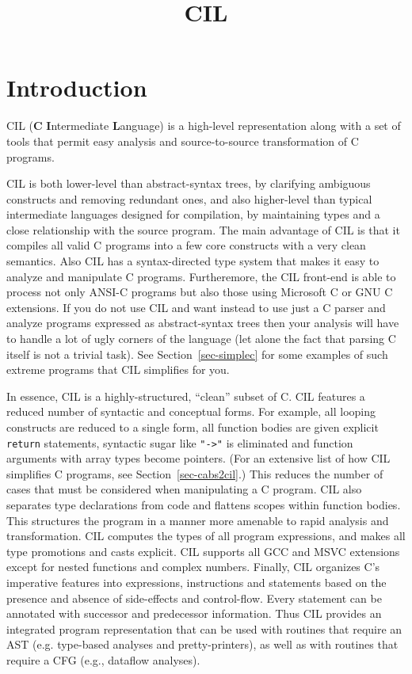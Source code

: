 \documentclass{article}
\title{CIL}
\def\secref#1{Section~\ref{sec-#1}}
\begin{document}
\maketitle

\section{Introduction}

 CIL ({\bf C} {\bf I}ntermediate {\bf L}anguage) is a high-level representation
along with a set of tools that permit easy analysis and source-to-source
transformation of C programs.

 CIL is both lower-level than abstract-syntax trees, by clarifying ambiguous
constructs and removing redundant ones, and also higher-level than typical
intermediate languages designed for compilation, by maintaining types and a
close relationship with the source program. The main advantage of CIL is that
it compiles all valid C programs into a few core constructs with a very clean
semantics. Also CIL has a syntax-directed type system that makes it easy to
analyze and manipulate C programs. Furtheremore, the CIL front-end is able to
process not only ANSI-C programs but also those using Microsoft C or GNU C
extensions. If you do not use CIL and want instead to use just a C parser and
analyze programs expressed as abstract-syntax trees then your analysis will
have to handle a lot of ugly corners of the language (let alone the fact that
parsing C itself is not a trivial task). See \secref{simplec} for some
examples of such extreme programs that CIL simplifies for you.

 In essence, CIL is a highly-structured, ``clean'' subset of C. CIL features a
reduced number of syntactic and conceptual forms. For example, all looping
constructs are reduced to a single form, all function bodies are given
explicit {\tt return} statements, syntactic sugar like {\tt "->"} is
eliminated and function arguments with array types become pointers. (For an
extensive list of how CIL simplifies C programs, see \secref{cabs2cil}.)
This reduces the number of cases that must be considered when manipulating a C
program. CIL also separates type declarations from code and flattens scopes
within function bodies. This structures the program in a manner more amenable
to rapid analysis and transformation. CIL computes the types of all program
expressions, and makes all type promotions and casts explicit. CIL supports
all GCC and MSVC extensions except for nested functions and complex numbers.
Finally, CIL organizes C's imperative features into expressions, instructions
and statements based on the presence and absence of side-effects and
control-flow. Every statement can be annotated with successor and predecessor
information. Thus CIL provides an integrated program representation that can
be used with routines that require an AST (e.g. type-based analyses and
pretty-printers), as well as with routines that require a CFG (e.g., dataflow
analyses).
\end{document}
